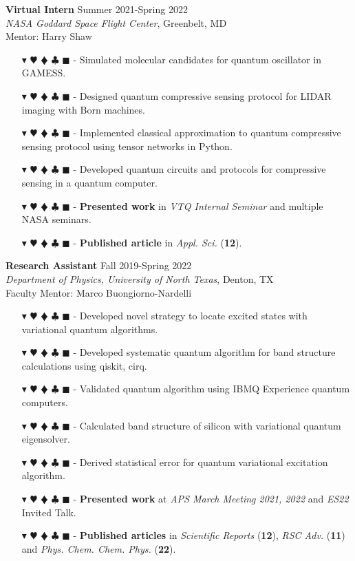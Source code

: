\documentclass[overlapped, 10pt]{res} %
\newcommand{\physics}{$\blacktriangledown$}
\newcommand{\biochem}{$\varheartsuit$}
\newcommand{\shannon}{$\vardiamondsuit$}
\newcommand{\classic}{$\clubsuit$}
\newcommand{\quantum}{$\blacksquare$}
\newcommand{\physicscolor}{\color{YellowOrange}}
\newcommand{\biochemcolor}{\color{Emerald}}
\newcommand{\shannoncolor}{\color{Goldenrod}}
\newcommand{\classiccolor}{\color{Cyan}}
\newcommand{\quantumcolor}{\color{RedOrange}}
\newcommand{\tag}[1]{
    {\IfSubStr{#1}{\physics}{\physicscolor}{\color{White}}\physics}
    {\IfSubStr{#1}{\biochem}{\biochemcolor}{\color{White}}\biochem}
    {\IfSubStr{#1}{\shannon}{\shannoncolor}{\color{White}}\shannon}
    {\IfSubStr{#1}{\classic}{\classiccolor}{\color{White}}\classic}
    {\IfSubStr{#1}{\quantum}{\quantumcolor}{\color{White}}\quantum}
}
\begin{document}
\begin{resume}
\textbf{Virtual Intern} \hfill Summer 2021-Spring 2022 \\
\textit{NASA Goddard Space Flight Center}, Greenbelt, MD \\
Mentor: Harry Shaw
\begin{itemize} \itemsep -2pt %
\item[\tag{\biochem\classic}-] Simulated molecular candidates for quantum oscillator in GAMESS.
\item[\tag{\shannon\quantum}-] Designed quantum compressive sensing protocol for LIDAR imaging with Born machines.
\item[\tag{\shannon\classic\quantum}-] Implemented classical approximation to quantum compressive sensing protocol using tensor networks in Python.
\item[\tag{\shannon\quantum}-] Developed quantum circuits and protocols for compressive sensing in a quantum computer.
\item[\tag{}-] \textbf{Presented work} in \textit{VTQ Internal Seminar} and multiple NASA seminars.
\item[\tag{}-] \textbf{Published article} in \textit{Appl. Sci.} (\textbf{12}).
\end{itemize}

\textbf{Research Assistant} \hfill Fall 2019-Spring 2022 \\
\textit{Department of Physics, University of North Texas}, Denton, TX \\
Faculty Mentor: Marco Buongiorno-Nardelli
\begin{itemize} \itemsep -2pt %
\item[\tag{\physics\quantum}-] Developed novel strategy to locate excited states with variational quantum algorithms.
\item[\tag{\physics\quantum}-] Developed systematic quantum algorithm for band structure calculations using qiskit, cirq.
\item[\tag{\physics\quantum}-] Validated quantum algorithm using IBMQ Experience quantum computers.
\item[\tag{\physics\quantum}-] Calculated band structure of silicon with variational quantum eigensolver.
\item[\tag{\physics\quantum}-] Derived statistical error for quantum variational excitation algorithm.
\item[\tag{}-] \textbf{Presented work} at \textit{APS March Meeting 2021, 2022} and \textit{ES22} Invited Talk.
\item[\tag{}-] \textbf{Published articles} in \textit{Scientific Reports} (\textbf{12}), \textit{RSC Adv.} (\textbf{11}) and \textit{Phys. Chem. Chem. Phys.} (\textbf{22}).
\end{itemize}


\end{resume}
\end{document}

